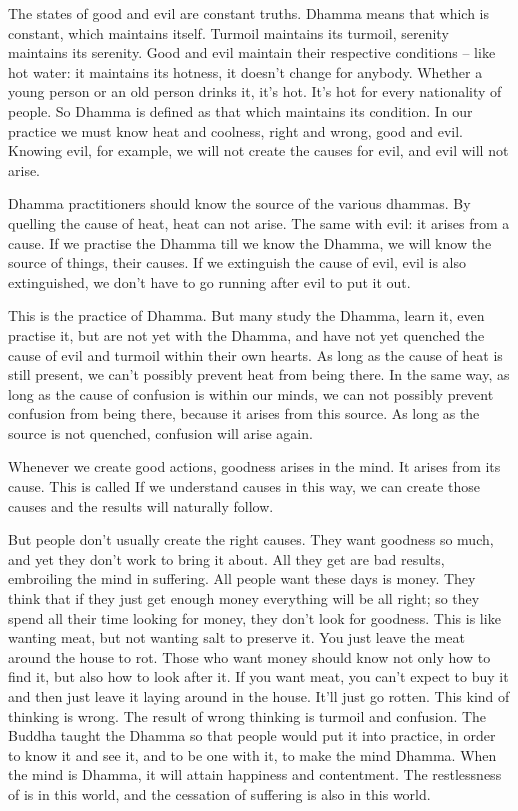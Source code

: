 The states of good and evil are constant truths. Dhamma means that which is constant, which maintains itself. Turmoil maintains its turmoil, serenity maintains its serenity. Good and evil maintain their respective conditions -- like hot water: it maintains its hotness, it doesn't change for anybody. Whether a young person or an old person drinks it, it's hot. It's hot for every nationality of people. So Dhamma is defined as that which maintains its condition. In our practice we must know heat and coolness, right and wrong, good and evil. Knowing evil, for example, we will not create the causes for evil, and evil will not arise.

Dhamma practitioners should know the source of the various dhammas. By quelling the cause of heat, heat can not arise. The same with evil: it arises from a cause. If we practise the Dhamma till we know the Dhamma, we will know the source of things, their causes. If we extinguish the cause of evil, evil is also extinguished, we don't have to go running after evil to put it out.

This is the practice of Dhamma. But many study the Dhamma, learn it, even practise it, but are not yet with the Dhamma, and have not yet quenched the cause of evil and turmoil within their own hearts. As long as the cause of heat is still present, we can't possibly prevent heat from being there. In the same way, as long as the cause of confusion is within our minds, we can not possibly prevent confusion from being there, because it arises from this source. As long as the source is not quenched, confusion will arise again.

Whenever we create good actions, goodness arises in the mind. It arises from its cause. This is called  If we understand causes in this way, we can create those causes and the results will naturally follow.

But people don't usually create the right causes. They want goodness so much, and yet they don't work to bring it about. All they get are bad results, embroiling the mind in suffering. All people want these days is money. They think that if they just get enough money everything will be all right; so they spend all their time looking for money, they don't look for goodness. This is like wanting meat, but not wanting salt to preserve it. You just leave the meat around the house to rot. Those who want money should know not only how to find it, but also how to look after it. If you want meat, you can't expect to buy it and then just leave it laying around in the house. It'll just go rotten. This kind of thinking is wrong. The result of wrong thinking is turmoil and confusion. The Buddha taught the Dhamma so that people would put it into practice, in order to know it and see it, and to be one with it, to make the mind Dhamma. When the mind is Dhamma, it will attain happiness and contentment. The restlessness of  is in this world, and the cessation of suffering is also in this world.

